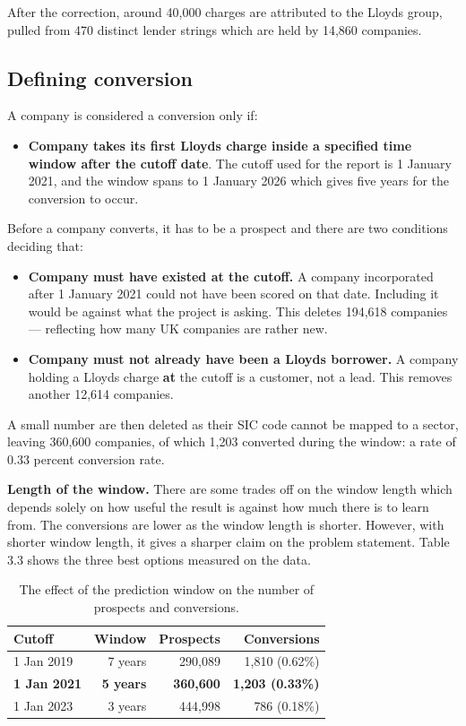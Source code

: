 \documentclass[ %
                    author={Natchalin Iwsakul \\ Inkaphol Siriwongwattana \\ Tanaphan Kummaraphat \\ Patorn Srisupap},
                supervisor={Fernando Moreno-Pino},
                    degree={MSc},
                     title={Propensity Modelling for SME Commercial Lending Using Open Public Data},
                  subtitle={Companies House filings and GDELT media coverage as predictors of first-time borrowing},
                      type={},
                      year={2026}]{dissertation}
\begin{document}
  After the correction, around 40,000 charges are attributed to the Lloyds group, pulled from 470 distinct lender strings which are held by 14,860 companies.
  
  \subsection{Defining conversion}
    A company is considered a conversion only if:

\begin{itemize}
    \item \textbf{Company takes its first Lloyds charge inside a specified time window after the cutoff date}. The cutoff used for the report is 1 January 2021, and the window spans to 1 January 2026 which gives five years for the conversion to occur.
\end{itemize}

Before a company converts, it has to be a prospect and there are two conditions deciding that:

\begin{itemize}
  \item \textbf{Company must have existed at the cutoff.} A company incorporated after
        1 January 2021 could not have been scored on that date. Including it would be against what the project is asking. This deletes 194,618 companies --- 
        reflecting how many UK companies are rather new.

  \item \textbf{Company must not already have been a Lloyds borrower.} A company holding
        a Lloyds charge \textbf{at} the cutoff is a customer, not a lead. This removes another 12,614 companies.
\end{itemize}

A small number are then deleted as their SIC code cannot be mapped to a sector, leaving 360,600 companies, of which 1,203 converted during the window: a rate of 0.33 percent conversion rate.

\textbf{Length of the window.} There are some trades off on the window length which depends solely on how useful the result is against how much there is to learn from. The conversions are lower as the window length is shorter. However, with shorter window length, it gives a sharper claim on the problem statement. Table 3.3 shows the three best options measured on the data. 

\begin{table}[H]
\centering
\begin{tabular}{lrrr}
\toprule
Cutoff & Window & Prospects & Conversions \\
\midrule
1 Jan 2019          & 7 years          & 290,089          & 1,810 (0.62\%) \\
\textbf{1 Jan 2021} & \textbf{5 years} & \textbf{360,600} & \textbf{1,203 (0.33\%)} \\
1 Jan 2023          & 3 years          & 444,998          &   786 (0.18\%) \\
\bottomrule
\end{tabular}
\caption[Prediction window options]{The effect of the prediction window on the
number of prospects and conversions.}
\label{tab:windows}
\end{table}
\end{document}

